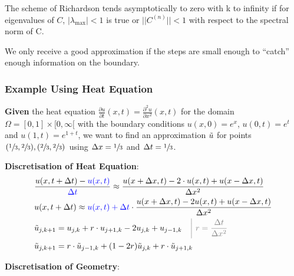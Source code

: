 The scheme of Richardson tends asymptotically to zero with k to infinity if
for eigenvalues of $C$, $|\lambda_\mathrm{max}|<1$ is true or $||C^{(n)}||<1$ with respect to the spectral norm of C.

We only receive a good approximation if the steps are small enough to ``catch'' enough information on the boundary.

\subsubsection{Example Using Heat Equation}

\textbf{Given} the heat equation $\frac{\partial u}{\partial t}(x,t) = \frac{\partial^2 u}{\partial x^2}(x,t)$
for the domain $\Omega = [0,1]\times [0, \infty[$ with the boundary conditions
$u(x,0) = e^x$, $u(0,t) = e^t$ and $u(1,t) = e^{1+t}$, we want to find an approximation $\tilde{u}$ for points
$(\sfrac{1}{3},\sfrac{2}{3}),(\sfrac{2}{3},\sfrac{2}{3})$ using $\Delta x = \sfrac{1}{3}$ and $\Delta t = \sfrac{1}{3}$.

\textbf{Discretisation of Heat Equation}:
\begin{align*}
	& \frac{u(x,t+\Delta t)-{\color{blue} u(x,t)}}{\color{blue}\Delta t}\approx\frac{u(x+\Delta x,t)-2\cdot u(x,t)+u(x-\Delta x,t)}{\Delta x^{2}} \\
	& u(x,t+\Delta t)\approx {\color{blue}u(x,t)+\Delta t}\cdot{\frac{u(x+\Delta x,t)-2 u(x,t)+u(x-\Delta x,t)}{\Delta x^{2}}} \\
	& \utild_{j,k+1}=u_{j,k}+r\cdot u_{j+1,k} - 2u_{j,k} + u_{j-1,k}\quad {\color{gray}\left|\ r=\frac{\Delta t}{\Delta x^2}\right.} \\
	& \utild_{j,k+1} = r\cdot\utild_{j-1,k}+(1-2r)\utild_{j,k} + r\cdot\utild_{j+1,k}
\end{align*}

\textbf{Discretisation of Geometry}:


